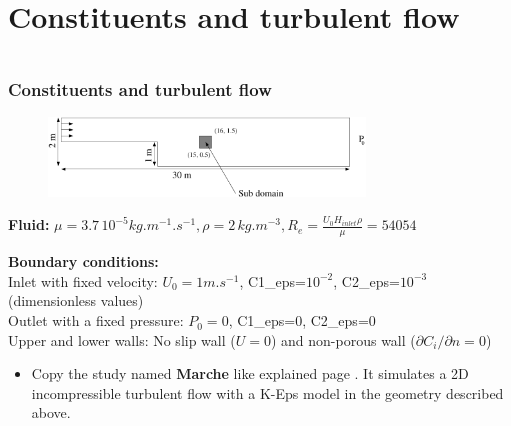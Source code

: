 \documentclass[10pt]{beamer}
\begin{document}
\section{Constituents and turbulent flow}
\begin{frame}
\begin{columns}[c] 
\tableofcontents[sections={1-6},currentsection, currentsubsection]
\tableofcontents[sections={7-12},currentsection, currentsubsection]
\end{columns}
\end{frame}
\begin{frame}
\frametitle{Constituents and turbulent flow}
\begin{block}{}

\begin{figure}
\includegraphics[width=0.75\textwidth]{PICTURES/marche.pdf}
\end{figure}

\textbf{Fluid:} $\mu=3.7 \, 10^{-5} kg.m^{-1}.s^{-1}, \rho=2 \, kg.m^{-3}, R_e=\frac{U_0 H_{inlet} \rho}{\mu} =54054$

\textbf{Boundary conditions:} \\
Inlet with fixed velocity: $U_0=1 m.s^{-1}$, C1\_eps=$10^{-2}$, C2\_eps=$10^{-3}$ (dimensionless values)\\
Outlet with a fixed pressure: $P_0=0$, C1\_eps=0, C2\_eps=0 \\
Upper and lower walls: No slip wall ($U=0$) and non-porous wall ($\partial C_i/\partial n=0$)

\begin{itemize}
\item Copy the study named \textbf{Marche} like explained page \pageref{method_copy}. It simulates a 2D incompressible turbulent flow with a K-Eps model in the geometry described above.
\end{itemize}

\end{block}
\end{frame}
\end{document}
